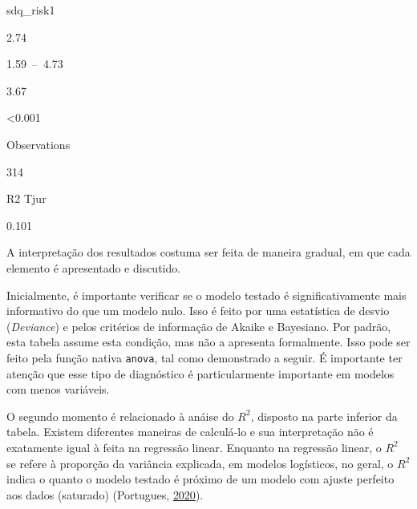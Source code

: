 \documentclass[
]{book}
\newenvironment{Shaded}{\begin{snugshade}}{\end{snugshade}}
\newcommand{\CommentTok}[1]{\textcolor[rgb]{0.56,0.35,0.01}{\textit{#1}}}
\newcommand{\DataTypeTok}[1]{\textcolor[rgb]{0.13,0.29,0.53}{#1}}
\newcommand{\DecValTok}[1]{\textcolor[rgb]{0.00,0.00,0.81}{#1}}
\newcommand{\KeywordTok}[1]{\textcolor[rgb]{0.13,0.29,0.53}{\textbf{#1}}}
\newcommand{\NormalTok}[1]{#1}
\newcommand{\OperatorTok}[1]{\textcolor[rgb]{0.81,0.36,0.00}{\textbf{#1}}}
\newcommand{\StringTok}[1]{\textcolor[rgb]{0.31,0.60,0.02}{#1}}
\begin{document}
sdq\_risk1

2.74

1.59~--~4.73

3.67

\textless0.001

Observations

314

R2 Tjur

0.101

A interpretação dos resultados costuma ser feita de maneira gradual, em
que cada elemento é apresentado e discutido.

Inicialmente, é importante verificar se o modelo testado é
significativamente mais informativo do que um modelo nulo. Isso é feito
por uma estatística de desvio (\emph{Deviance}) e pelos critérios de
informação de Akaike e Bayesiano. Por padrão, esta tabela assume esta
condição, mas não a apresenta formalmente. Isso pode ser feito pela
função nativa \texttt{anova}, tal como demonstrado a seguir. É
importante ter atenção que esse tipo de diagnóstico é particularmente
importante em modelos com menos variáveis.

\begin{Shaded}
\end{Shaded}

O segundo momento é relacionado à anáise do \(R^2\), disposto na parte
inferior da tabela. Existem diferentes maneiras de calculá-lo e sua
interpretação não é exatamente igual à feita na regressão linear.
Enquanto na regressão linear, o \(R^2\) se refere à proporção da
variância explicada, em modelos logísticos, no geral, o \(R^2\) indica o
quanto o modelo testado é próximo de um modelo com ajuste perfeito aos
dados (saturado) (Portugues,
\protect\hyperlink{ref-portugues2020}{2020}).
\end{document}
